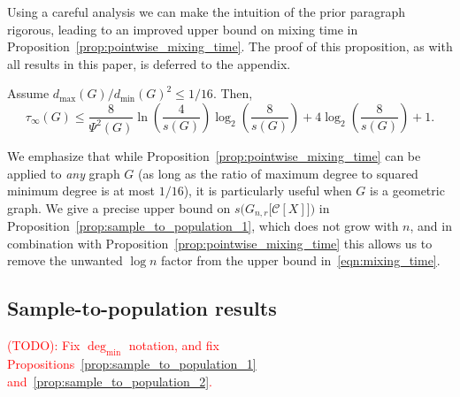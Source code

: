 \documentclass[11pt,twoside]{article}
\newcommand{\1}{\mathbf{1}}
\newcommand{\mc}[1]{\mathcal{#1}}
\begin{document}
Using a careful analysis we can make the intuition of the prior paragraph rigorous, leading to an improved upper bound on mixing time in Proposition~\ref{prop:pointwise_mixing_time}. The proof of this proposition, as with all results in this paper, is deferred to the appendix.
\begin{proposition}
	\label{prop:pointwise_mixing_time}
	Assume $d_{\max}(G)/d_{\min}(G)^2 \leq 1/16$. Then,
	\begin{equation}
	\label{eqn:pointwise_mixing_time}
	\tau_{\infty}(G) \leq \frac{8}{\Psi^2(G)} \ln \left(\frac{4}{s(G)}\right)\log_2 \left(\frac{8}{s(G)}\right)  + 4\log_2 \left(\frac{8}{s(G)}\right) + 1.
	\end{equation}
\end{proposition}

We emphasize that while Proposition~\ref{prop:pointwise_mixing_time} can be applied to \emph{any} graph $G$ (as long as the ratio of maximum degree to squared minimum degree is at most $1/16$), it is particularly useful when $G$ is a geometric graph. We give a precise upper bound on $s\bigl(G_{n,r}\bigl[\mc{C}[X]\bigr]\bigr)$ in Proposition~\ref{prop:sample_to_population_1}, which does not grow with $n$, and in combination with Proposition~\ref{prop:pointwise_mixing_time} this allows us to remove the unwanted $\log n$ factor from the upper bound in~\eqref{eqn:mixing_time}. 

\subsection{Sample-to-population results}
\label{subsec:sample_to_population}
\textcolor{red}{(TODO): Fix $\deg_{\min}$ notation, and fix Propositions~\ref{prop:sample_to_population_1} and~\ref{prop:sample_to_population_2}.}\\
\end{document}

